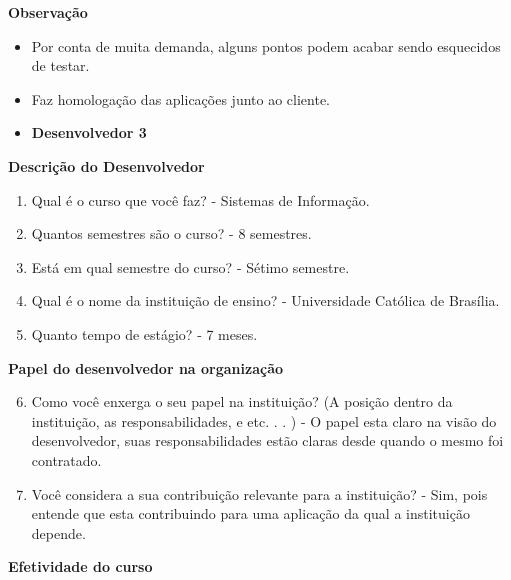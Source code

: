 \begin{anexosenv}
\textbf{Observação}

\begin{itemize}
\item Por conta de muita demanda, alguns pontos podem acabar sendo esquecidos de testar.
\item Faz homologação das aplicações junto ao cliente.
\end{itemize}


\begin{itemize}
\item \textbf{Desenvolvedor 3}
\end{itemize}

\textbf{Descrição do Desenvolvedor}

\begin{enumerate}
\item Qual é o curso que você faz?\newline
- Sistemas de Informação.
\item Quantos semestres são o curso?\newline
- 8 semestres.
\item Está em qual semestre do curso?\newline
- Sétimo semestre.
\item Qual é o nome da instituição de ensino?\newline
- Universidade Católica de Brasília.
\item Quanto tempo de estágio?\newline
- 7 meses.
\end{enumerate}

\textbf{Papel do desenvolvedor na organização}

\begin{enumerate}
\setcounter{enumi}{5}
\item Como você enxerga o seu papel na instituição? (A posição dentro da instituição, as
responsabilidades, e etc. . . )\newline
- O papel esta claro na visão do desenvolvedor, suas responsabilidades estão claras desde quando o mesmo foi contratado.
\item Você considera a sua contribuição relevante para a instituição?\newline
- Sim, pois entende que esta contribuindo para uma aplicação da qual a instituição depende.
\end{enumerate}

\textbf{Efetividade do curso}


\end{anexosenv}
